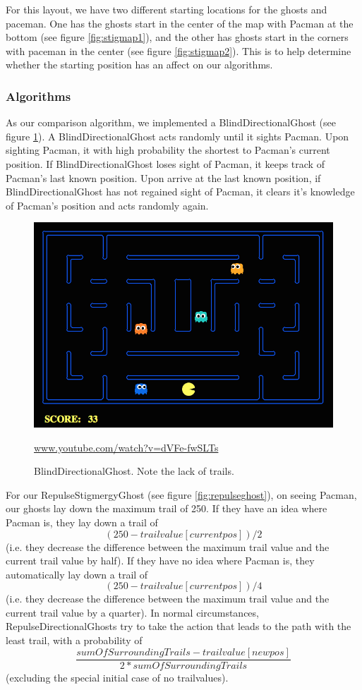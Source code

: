 \documentclass[11pt]{article}
\begin{document}
\begin{multicols}{2}
For this layout, we have two different starting locations for the ghosts and paceman.  One has the ghosts start in the center of the map with Pacman at the bottom (see figure \ref{fig:stigmap1}), and the other has ghosts start in the corners with paceman in the center (see figure \ref{fig:stigmap2}).  This is to help determine whether the starting position has an affect on our algorithms.

\subsubsection{Algorithms}

As our comparison algorithm, we implemented a BlindDirectionalGhost (see figure \ref{fig:blindghost}). A BlindDirectionalGhost acts randomly until it sights Pacman.  Upon sighting Pacman, it with high probability the shortest to Pacman's current position.  If BlindDirectionalGhost loses sight of Pacman, it keeps track of Pacman's last known position.  Upon arrive at the last known position, if BlindDirectionalGhost has not regained sight of Pacman, it clears it's knowledge of Pacman's position and acts randomly again.
\begin{figure}[H]
	\includegraphics[width=\columnwidth]{BlindDirectionalGhost.png}
	\caption{BlindDirectionalGhost. Note the lack of trails.}
 	\protect\url{www.youtube.com/watch?v=dVFe-fwSLTs} 
	\label{fig:blindghost}
\end{figure}

For our RepulseStigmergyGhost  (see figure \ref{fig:repulseghost}), on seeing Pacman, our ghosts lay down the maximum trail of 250.  If they have an idea where Pacman is, they lay down a trail of $$(250 - trailvalue[currentpos]) / 2$$ (i.e. they decrease the difference between the maximum trail value and the current trail value by half).   If they have no idea where Pacman is, they automatically lay down a trail of $$(250 - trailvalue[currentpos]) / 4$$ (i.e. they decrease the difference between the maximum trail value and the current trail value by a quarter). In normal circumstances, RepulseDirectionalGhosts try to take the action that leads to the path with the least trail, with a probability of $$\frac{sumOfSurroundingTrails - trailvalue[newpos]}{2 * sumOfSurroundingTrails}$$ (excluding the special initial case of no trailvalues).


\end{multicols}
\end{document}
